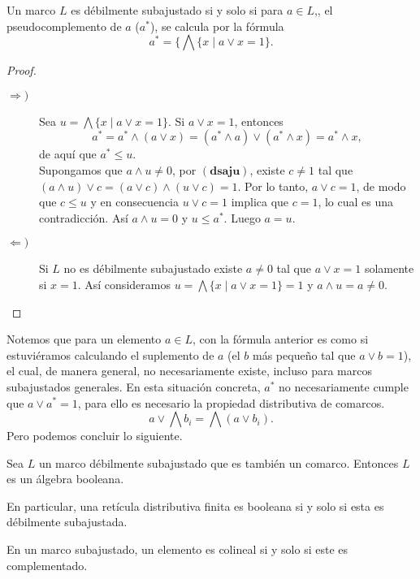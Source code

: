 \documentclass{comunicaciones}
\begin{document}
\begin{thm}\label{Pseudocomplemento}
    Un marco $L$ es débilmente subajustado si y solo si para $a\in L$,, el pseudocomplemento de $a$ ($a^*$), se calcula por la fórmula 
    \[
    a^*=\{\bigwedge\{x\mid a\vee x=1\}.
    \]
\end{thm}

\begin{proof}
    \begin{description}
        \item[$\Rightarrow )$] Sea $u=\bigwedge\{x\mid a\vee x=1\}$. Si $a\vee x=1$, entonces 
        \[
        a^*=a^*\wedge(a\vee x)=(a^*\wedge a)\vee (a^*\wedge x)=a^*\wedge x,
        \]
        de aquí que $a^*\leq u$.\\

        \noindent
        Supongamos que $a\wedge u\neq 0$, por $(\mathbf{dsaju})$, existe $c\neq 1$ tal que $(a\wedge u)\vee c=(a\vee c)\wedge (u\vee c)=1$. Por lo tanto, $a\vee c=1$, de modo que $c\leq u$ y en consecuencia $u\vee c=1$ implica que $c=1$, lo cual es una contradicción. Así $a\wedge u=0$ y $u\leq a^*$. Luego $a=u$.
        \item[$\Leftarrow )$] Si $L$ no es débilmente subajustado existe $a\neq 0$ tal que $a\vee x=1$ solamente si $x=1$. Así consideramos $u=\bigwedge\{x\mid a\vee x=1\}=1$ y $a\wedge u=a\neq 0$. 
    \end{description}
\end{proof}

Notemos que para un elemento $a\in L$, con la fórmula anterior es como si estuviéramos calculando el suplemento de $a$ (el $b$ más pequeño tal que $a\vee b=1$), el cual, de manera general, no necesariamente existe, incluso para marcos subajustados generales. En esta situación concreta, $a^*$ no necesariamente cumple que $a\vee a^*=1$, para ello es necesario la propiedad distributiva de comarcos.
\[
a\vee \bigwedge b_i=\bigwedge (a\vee b_i).
\]
Pero podemos concluir lo siguiente.

\begin{thm}
    Sea $L$ un marco débilmente subajustado que es también un comarco. Entonces $L$ es un álgebra booleana.
\end{thm}

En particular, una retícula distributiva finita es booleana si y solo si esta es débilmente subajustada.

\begin{prop}
    En un marco subajustado, un elemento es colineal si y solo si este es complementado.
\end{prop}
\end{document}
